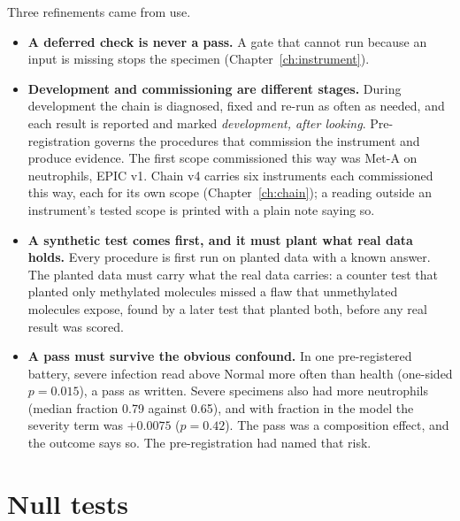 Three refinements came from use.
\begin{itemize}
\item \textbf{A deferred check is never a pass.} A gate that cannot run because an input is missing stops the specimen (Chapter~\ref{ch:instrument}).
\item \textbf{Development and commissioning are different stages.} During development the chain is diagnosed, fixed and re-run as often as needed, and each
      result is reported and marked \emph{development, after looking}. Pre-registration governs the procedures that commission the instrument and produce
 evidence. The first scope commissioned this way was Met-A on neutrophils, EPIC v1. Chain v4 carries six instruments each commissioned this way, each for its own scope (Chapter~\ref{ch:chain}); a reading outside an instrument's tested scope is printed with a plain note saying so.
\item \textbf{A synthetic test comes first, and it must plant what real data holds.} Every procedure is first run on planted data with a known answer. The planted data must carry what the real data carries: a counter test that planted only methylated molecules missed a flaw that unmethylated molecules expose, found by a later test that planted both, before any real result was scored.
\item \textbf{A pass must survive the obvious confound.} In one pre-registered battery, severe infection read above Normal more often than health
      (one-sided $p=0.015$), a pass as written. Severe specimens also had more neutrophils (median fraction 0.79 against 0.65), and with fraction in the model
      the severity term was $+0.0075$ ($p=0.42$). \measured{} The pass was a composition effect, and the
      outcome says so. The pre-registration had named that risk.
\end{itemize}

\section{Null tests}

